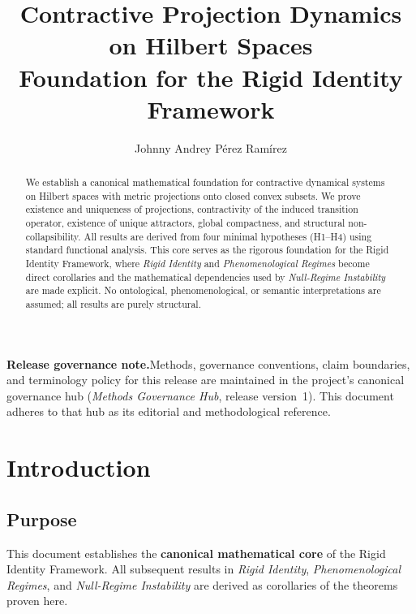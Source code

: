 \documentclass[11pt,a4paper]{article}
\title{%
\textbf{Contractive Projection Dynamics on Hilbert Spaces}\\[0.5em]
\large Foundation for the Rigid Identity Framework
}
\author{Johnny Andrey P\'{e}rez Ram\'{i}rez}
\date{}
\theoremstyle{plain}
\theoremstyle{definition}
\begin{document}
\maketitle

\begin{abstract}
We establish a canonical mathematical foundation for contractive dynamical systems on Hilbert spaces with metric projections onto closed convex subsets. We prove existence and uniqueness of projections, contractivity of the induced transition operator, existence of unique attractors, global compactness, and structural non-collapsibility. All results are derived from four minimal hypotheses (H1--H4) using standard functional analysis. This core serves as the rigorous foundation for the Rigid Identity Framework, where \textit{Rigid Identity} and \textit{Phenomenological Regimes} become direct corollaries and the mathematical dependencies used by \textit{Null-Regime Instability} are made explicit. No ontological, phenomenological, or semantic interpretations are assumed; all results are purely structural.
\end{abstract}

\noindent\textbf{Release governance note.}\enspace Methods, governance conventions, claim boundaries, and terminology policy for this release are maintained in the project's canonical governance hub (\textit{Methods Governance Hub}, release version~1). This document adheres to that hub as its editorial and methodological reference.

\tableofcontents
\newpage

\section{Introduction}

\subsection{Purpose}

This document establishes the \textbf{canonical mathematical core} of the Rigid Identity Framework. All subsequent results in \textit{Rigid Identity}, \textit{Phenomenological Regimes}, and \textit{Null-Regime Instability} are derived as corollaries of the theorems proven here.
\end{document}
